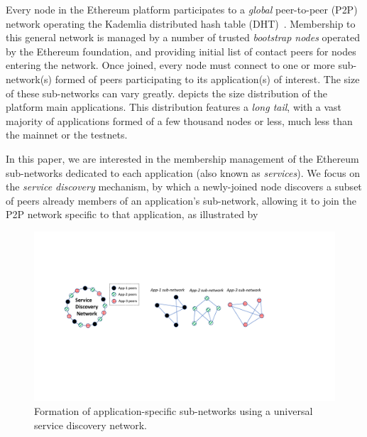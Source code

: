 Every node in the Ethereum platform participates to a \emph{global} peer-to-peer (P2P) network operating the Kademlia distributed hash table (DHT)~\cite{maymounkov2002kademlia}. 
Membership to this general network is managed by a number of trusted \emph{bootstrap nodes} operated by the Ethereum foundation, and providing initial list of contact peers for nodes entering the network.
Once joined, every node must connect to one or more sub-network(s) formed of peers participating to its application(s) of interest.
The size of these sub-networks can vary greatly.
 depicts the size distribution of the platform main applications.
This distribution features a \emph{long tail}, with a vast majority of applications formed of a few thousand nodes or less, much less than the mainnet or the testnets. 

In this paper, we are interested in the membership management of the Ethereum sub-networks dedicated to each application (also known as \emph{services}).
We focus on the \emph{service discovery} mechanism, by which a newly-joined node discovers a subset of peers already members of an application's sub-network, allowing it to join the P2P network specific to that application, as illustrated by 

\begin{figure}[b!]
    \includegraphics[width=1\linewidth]{img/subnetwork}
    \caption{Formation of application-specific sub-networks using a universal service discovery network.}
    \label{fig:subnetwork}
\end{figure}

